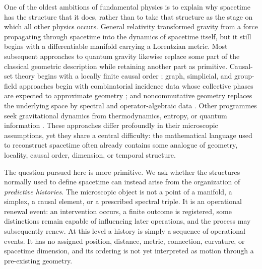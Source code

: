 \documentclass[11pt]{article}
\theoremstyle{definition}
\theoremstyle{remark}
\begin{document}
One of the oldest ambitions of fundamental physics is to explain why spacetime
has the structure that it does, rather than to take that structure as the stage
on which all other physics occurs.  General relativity transformed gravity
from a force propagating through spacetime into the dynamics of spacetime
itself, but it still begins with a differentiable manifold carrying a
Lorentzian metric.  Most subsequent approaches to quantum gravity likewise
replace some part of the classical geometric description while retaining
another part as primitive.  Causal-set theory begins with a locally finite
causal order \cite{bombelli-sorkin,surya}; graph, simplicial, and group-field
approaches begin with combinatorial incidence data whose collective phases are
expected to approximate geometry
\cite{konopkamarkopouloseverini2008,ambjornjurkiewiczloll2009,oriti2009};
and noncommutative geometry replaces the underlying space by spectral and
operator-algebraic data \cite{Connes1994}.  Other programmes seek gravitational
dynamics from thermodynamics, entropy, or quantum information
\cite{jacobson1995,verlinde2011,vanraamsdonk2010}.  These approaches differ
profoundly in their microscopic assumptions, yet they share a central
difficulty: the mathematical language used to reconstruct spacetime often
already contains some analogue of geometry, locality, causal order, dimension,
or temporal structure.

The question pursued here is more primitive.  We ask whether the structures
normally used to define spacetime can instead arise from the organization of
\emph{predictive histories}.  The microscopic object is not a point of a
manifold, a simplex, a causal element, or a prescribed spectral triple.  It is
an operational renewal event: an intervention occurs, a finite outcome is
registered, some distinctions remain capable of influencing later operations,
and the process may subsequently renew.  At this level a history is simply a
sequence of operational events.  It has no assigned position, distance, metric,
connection, curvature, or spacetime dimension, and its ordering is not yet
interpreted as motion through a pre-existing geometry.
\end{document}
